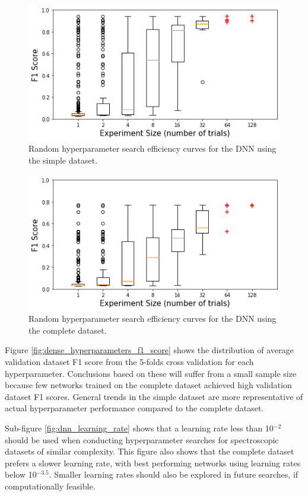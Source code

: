 \begin{figure}[H]
	\centering
	\includegraphics[width=0.8\linewidth]{images/random_hp_search_dnn_easy}
	\caption{Random hyperparameter search efficiency curves for the DNN using the simple dataset.}
	\label{fig:random_hp_search_dnn_easy}
\end{figure}

\begin{figure}[H]
	\centering
	\includegraphics[width=0.8\linewidth]{images/random_hp_search_dnn_full}
	\caption{Random hyperparameter search efficiency curves for the DNN using the complete dataset.}
	\label{fig:random_hp_search_dnn_full}
\end{figure}


Figure \ref{fig:dense_hyperparameters_f1_score} shows the distribution of average validation dataset F1 score from the 5-folds cross validation for each hyperparameter. Conclusions based on these will suffer from a small sample size because few networks trained on the complete dataset achieved high validation dataset F1 scores. General trends in the simple dataset are more representative of actual hyperparameter performance compared to the complete dataset.

Sub-figure \ref{fig:dnn_learning_rate} shows that a learning rate less than 10$^{-2}$ should be used when conducting hyperparameter searches for spectroscopic datasets of similar complexity. This figure also shows that the complete dataset prefers a slower learning rate, with best performing networks using learning rates below 10$^{-3.5}$. Smaller learning rates should also be explored in future searches, if computationally feasible.

